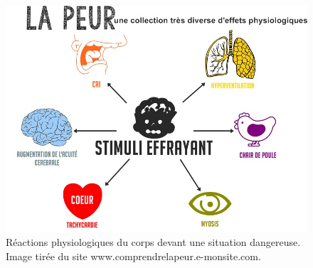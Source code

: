 \begin{figure}
  \centering
  \includegraphics[width=12cm]{./Chapitre1/figures/peur.jpg}
  \caption{Réactions physiologiques du corps devant une situation dangereuse. Image tirée du site www.comprendrelapeur.e-monsite.com.}
  \label{fig:peur}
\end{figure}
